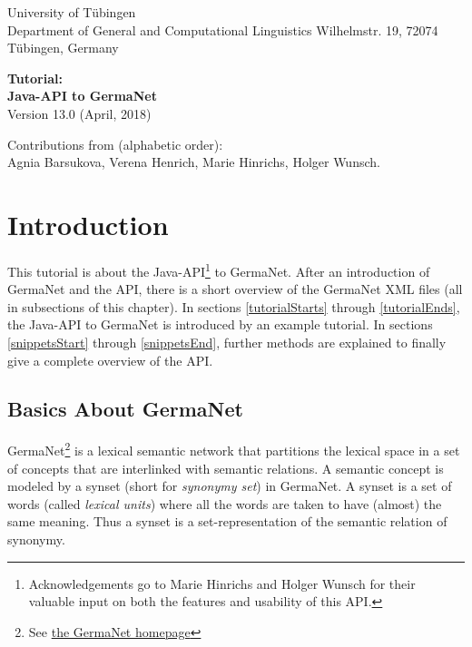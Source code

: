 \documentclass[12pt,a4paper,english,utf8]{report}
\begin{document}
\begin{titlepage}
\begin{flushleft}
{\large University of Tübingen\\
Department of General and Computational Linguistics
Wilhelmstr. 19, 72074 Tübingen, Germany}\\[4.5cm]
\end{flushleft}

\begin{center}
{\huge \bfseries Tutorial:\\[0.4cm]
Java-API to GermaNet}\\[1.0cm]
{\large Version 13.0 (April, 2018)}\\[10.0cm]
\end{center}

\begin{flushleft} \small
Contributions from (alphabetic order):\\
Agnia Barsukova, Verena Henrich, Marie Hinrichs, Holger Wunsch.
\end{flushleft}


\end{titlepage}

\tableofcontents
\newpage



\chapter{Introduction}
This tutorial is about the Java-API\footnote{Acknowledgements go to Marie Hinrichs and Holger Wunsch for their valuable input on both the features and usability of this API.} to GermaNet. After an introduction of GermaNet and the API, there is a short overview of the GermaNet XML files (all in subsections of this chapter). In sections \ref{tutorialStarts} through \ref{tutorialEnds}, the Java-API to GermaNet is introduced by an example tutorial. In sections \ref{snippetsStart} through \ref{snippetsEnd}, further methods are explained to finally give a complete overview of the API.



\section{Basics About GermaNet}
GermaNet\footnote{See \href{http://www.sfs.uni-tuebingen.de/GermaNet/}{the GermaNet homepage}} is a lexical semantic network that partitions the lexical space in a set of concepts that are interlinked with semantic relations. A semantic concept is modeled by a synset (short for \emph{synonymy set}) in GermaNet. A synset is a set of words (called \emph{lexical units}) where all the words are taken to have (almost) the same meaning. Thus a synset is a set-representation of the semantic relation of synonymy.
\end{document}
